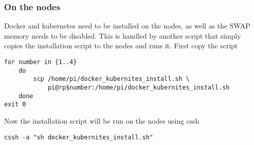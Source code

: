 \subsubsection{On the nodes}

Docker and kubernetes need to be installed on the nodes, as well as the
SWAP memory needs to be disabled. This is handled by another script that
simply copies the installation script to the nodes and runs it. First
copy the script

\begin{lstlisting}
for number in {1..4}
    do 
        scp /home/pi/docker_kubernites_install.sh \
            pi@rp$number:/home/pi/docker_kubernites_install.sh
    done
exit 0
\end{lstlisting}

Now the installation script will be run on the nodes using cssh

\begin{lstlisting}
cssh -a "sh docker_kubernites_install.sh"
\end{lstlisting}

